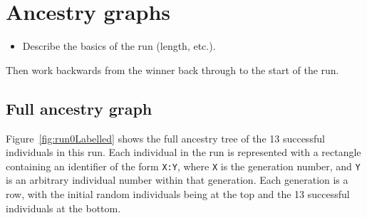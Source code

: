 

\section{Ancestry graphs}
\label{sec:ancestryGraphs}





\begin{itemize}
	\item Describe the basics of the run (length, etc.).
\end{itemize}

Then work backwards from the winner back through to the start of the run.

\subsection{Full ancestry graph}

Figure~\ref{fig:run0Labelled} shows the full ancestry tree of the 13 successful 
individuals in this run. Each individual in the run is represented with a
rectangle containing an identifier of the form \texttt{X:Y}, where \texttt{X}
is the generation number, and \texttt{Y} is an arbitrary individual number
within that generation. Each generation is a row, with the initial random
individuals being at the top and the 13 successful individuals at the bottom.

